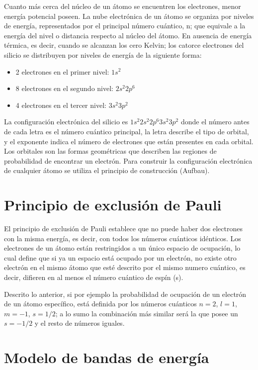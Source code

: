 Cuanto más cerca del núcleo de un átomo se encuentren los electrones, menor energía potencial poseen. La nube electrónica de un átomo se organiza por niveles de energía, representados por el principal número cuántico, n; que equivale a la energía del nivel o distancia respecto al núcleo del átomo. En ausencia de energía térmica, es decir, cuando se alcanzan los cero Kelvin; los catorce electrones del silicio se distribuyen por niveles de energía de la siguiente forma:

\begin{itemize}
\item 2 electrones en el primer nivel: $1s^2$
\item 8 electrones en el segundo nivel: $2s^2 2p^6$
\item 4 electrones en el tercer nivel: $3s^2 3p^2$
\end{itemize}

La configuración electrónica del silicio es $1s^{2}2s^{2}2p^{6}3s^{2}3p^{2}$ donde el número antes de cada letra es el número cuántico principal, la letra describe el tipo de orbital, y el exponente indica el número de electrones que están presentes en cada orbital. Los orbitales son las formas geométricas que describen las regiones de probabilidad de encontrar un electrón. Para construir la configuración electrónica de cualquier átomo se utiliza el principio de construcción (Aufbau).


\newpage
\section{Principio de exclusión de Pauli}

El principio de exclusión de Pauli \cite{b4} establece que no puede haber dos electrones con la misma energía, es decir, con todos los números cuánticos idénticos. Los electrones de un átomo están restringidos a un único espacio de ocupación, lo cual define que si ya un espacio está ocupado por un electrón, no existe otro electrón en el mismo átomo que esté descrito por el mismo numero cuántico, es decir, difieren en al menos el número cuántico de espín (s).  

Descrito lo anterior, si por ejemplo la probabilidad de ocupación de un electrón de un átomo específico, está definida por los números cuánticos $n=2$, $l=1$, $m=-1$, $s=1/2$; a lo sumo la combinación más similar será la que posee un $s=-1/2$ y el resto de números iguales.


\section{Modelo de bandas de energía}

